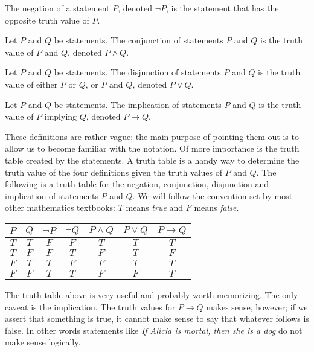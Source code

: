 \begin{definition}{}
	The negation of a statement $P$, denoted $\neg P$, is the statement that has the opposite truth value of $P$.
\end{definition}
\begin{definition}{}
	Let $P$ and $Q$ be statements. The conjunction of statements $P$ and $Q$ is the truth value of $P$ and $Q$, denoted $P \land Q$.
\end{definition}
\begin{definition}{}
	Let $P$ and $Q$ be statements. The disjunction of statements $P$ and $Q$ is the truth value of either $P$ or $Q$, or $P$ and $Q$, denoted $P \lor Q$.
\end{definition}
\begin{definition}{}
	Let $P$ and $Q$ be statements. The implication of statements $P$ and $Q$ is the truth value of $P$ implying $Q$, denoted $P\to Q$.
\end{definition}

These definitions are rather vague; the main purpose of pointing them out is to allow us to become familiar with the notation. Of more importance is the truth table created by the statements. A truth table is a handy way to determine the truth value of the four definitions given the truth values of $P$ and $Q$. The following is a truth table for the negation, conjunction, disjunction and implication of statements $P$ and $Q$. We will follow the convention set by most other mathematics textbooks: $T$ means \textit{true} and $F$ means \textit{false}.

\begin{center}
	\begin{tabular}{c | c | c | c | c | c | c}
		$P$ & $Q$ & $\neg P$ & $\neg Q$ & $P \land Q$ & $P \lor Q$ & $P \to Q$ \\
		\hline
		$T$ & $T$ & $F$      & $F$      & $T$         & $T$        & $T$       \\
		$T$ & $F$ & $F$      & $T$      & $F$         & $T$        & $F$       \\
		$F$ & $T$ & $T$      & $F$      & $F$         & $T$        & $T$       \\
		$F$ & $F$ & $T$      & $T$      & $F$         & $F$        & $T$       \\
	\end{tabular}
\end{center}

The truth table above is very useful and probably worth memorizing. The only caveat is the implication. The truth values for $P\to Q$ makes sense, however; if we assert that something is true, it cannot make sense to say that whatever follows is false. In other words statements like \textit{If Alicia is mortal, then she is a dog} do not make sense logically.

